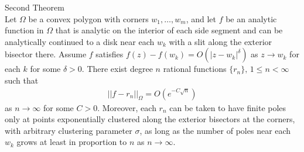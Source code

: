 \documentclass{seminar}
\begin{document}
\begin{slide} %
\large Second Theorem \\

\small
Let $\Omega$ be a convex polygon with corners $w_1 , \ldots , w_m$, and let $f$ be an analytic function in $\Omega$ that is analytic on the interior of each side segment and can be analytically continued to a disk near each $w_k$ with a slit along the exterior bisector there. Assume $f$ satisfies $f(z)-f(w_k)=O(|z-w_k|^\delta)$ as $z \to w_k$ for each $k$ for some $\delta >0$. There exist degree $n$ rational functions $\{r_n\},\, 1 \leq n < \infty$ such that
	\begin{align*}
	||f-r_n||_\Omega=O(e^{-C\sqrt{n}})
	\end{align*}
as $n\to \infty$ for some $C>0$. Moreover, each $r_n$ can be taken to have finite poles only at points exponentially clustered along the exterior bisectors at the corners, with arbitrary clustering parameter $\sigma$, as long as the number of poles near each $w_k$ grows at least in proportion to $n$ as $n\to \infty$.
\end{slide} %
\end{document}
